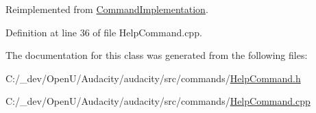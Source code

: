 Reimplemented from \hyperlink{class_command_implementation_a7b8787ad3b911316df9f097049a9eac3}{Command\+Implementation}.



Definition at line 36 of file Help\+Command.\+cpp.



The documentation for this class was generated from the following files\+:\begin{DoxyCompactItemize}
\item 
C\+:/\+\_\+dev/\+Open\+U/\+Audacity/audacity/src/commands/\hyperlink{_help_command_8h}{Help\+Command.\+h}\item 
C\+:/\+\_\+dev/\+Open\+U/\+Audacity/audacity/src/commands/\hyperlink{_help_command_8cpp}{Help\+Command.\+cpp}\end{DoxyCompactItemize}
